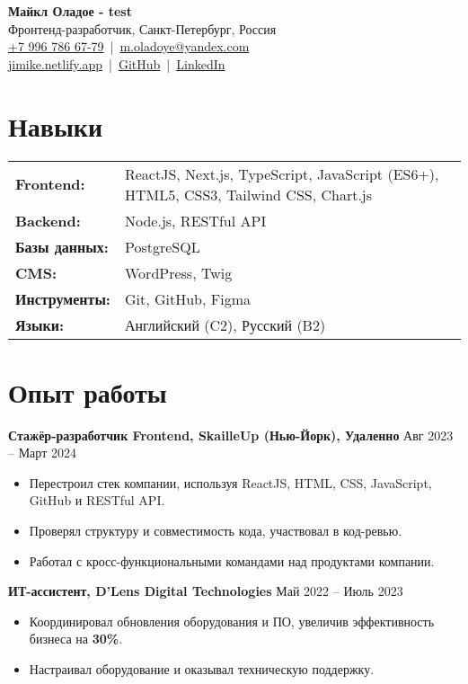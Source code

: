 \documentclass[a4paper,10pt]{article}
\begin{document}
\begin{center}
    {\LARGE \textbf{Майкл Оладое - test}} \\[4pt]
    Фронтенд-разработчик, Санкт-Петербург, Россия \\[4pt]
    \href{tel:+79967866779}{+7 996 786 67-79} \,|\, \href{mailto:m.oladoye@yandex.com}{m.oladoye@yandex.com} \\
    \href{https://jimike.netlify.app}{jimike.netlify.app} \,|\, 
    \href{https://github.com/Jimike110}{GitHub} \,|\, 
    \href{https://www.linkedin.com/in/jimike}{LinkedIn}
\end{center}

\section*{Навыки}
\begin{tabular}{ l l }
\textbf{Frontend:} & ReactJS, Next.js, TypeScript, JavaScript (ES6+), HTML5, CSS3, Tailwind CSS, Chart.js \\
\textbf{Backend:} & Node.js, RESTful API \\
\textbf{Базы данных:} & PostgreSQL \\
\textbf{CMS:} & WordPress, Twig \\
\textbf{Инструменты:} & Git, GitHub, Figma \\
\textbf{Языки:} & Английский (C2), Русский (B2) \\
\end{tabular}

\section*{Опыт работы}
\textbf{Стажёр-разработчик Frontend, SkailleUp (Нью-Йорк), Удаленно} \hfill Авг 2023 – Март 2024 \\
\begin{itemize}[left=0.5cm]
    \item Перестроил стек компании, используя ReactJS, HTML, CSS, JavaScript, GitHub и RESTful API.
    \item Проверял структуру и совместимость кода, участвовал в код-ревью.
    \item Работал с кросс-функциональными командами над продуктами компании.
\end{itemize}

\noindent \textbf{ИТ-ассистент, D’Lens Digital Technologies} \hfill Май 2022 – Июль 2023 \\
\begin{itemize}[left=0.5cm]
    \item Координировал обновления оборудования и ПО, увеличив эффективность бизнеса на \textbf{30\%}.
    \item Настраивал оборудование и оказывал техническую поддержку.
\end{itemize}
\end{document}
